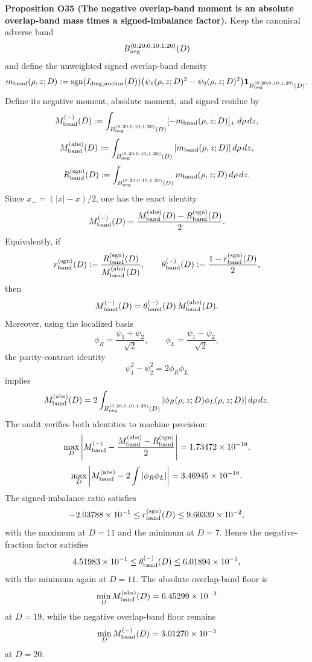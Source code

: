 \documentclass[aps,prd,onecolumn,notitlepage,nofootinbib,superscriptaddress,11pt,floatfix]{revtex4-2}
\begin{document}
\medskip\noindent\textbf{Proposition O35 (The negative overlap-band moment is an absolute overlap-band mass times a signed-imbalance factor).}
Keep the canonical adverse band
\[
B_{\rm neg}^{(0.20;0.10,1.20)}(D)
\]
and define the unweighted signed overlap-band density
\[
m_{\rm band}(\rho,z;D)
:=
\operatorname{sgn}(I_{\rm diag,anchor}(D))\bigl(\psi_1(\rho,z;D)^2-\psi_2(\rho,z;D)^2\bigr)
\mathbf 1_{B_{\rm neg}^{(0.20;0.10,1.20)}(D)}.
\]
Define its negative moment, absolute moment, and signed residue by
\[
M_{\rm band}^{(-)}(D)
:=
\int_{B_{\rm neg}^{(0.20;0.10,1.20)}(D)} [ -m_{\rm band}(\rho,z;D)]_+\,d\rho\,dz,
\]
\[
M_{\rm band}^{\rm(abs)}(D)
:=
\int_{B_{\rm neg}^{(0.20;0.10,1.20)}(D)} |m_{\rm band}(\rho,z;D)|\,d\rho\,dz,
\]
\[
R_{\rm band}^{\rm(sgn)}(D)
:=
\int_{B_{\rm neg}^{(0.20;0.10,1.20)}(D)} m_{\rm band}(\rho,z;D)\,d\rho\,dz.
\]
Since \(x_-=(|x|-x)/2\), one has the exact identity
\[
M_{\rm band}^{(-)}(D)
=
\frac{M_{\rm band}^{\rm(abs)}(D)-R_{\rm band}^{\rm(sgn)}(D)}{2}.
\]
Equivalently, if
\[
r_{\rm band}^{\rm(sgn)}(D)
:=
\frac{R_{\rm band}^{\rm(sgn)}(D)}{M_{\rm band}^{\rm(abs)}(D)},
\qquad
\theta_{\rm band}^{(-)}(D)
:=
\frac{1-r_{\rm band}^{\rm(sgn)}(D)}{2},
\]
then
\[
M_{\rm band}^{(-)}(D)=\theta_{\rm band}^{(-)}(D)\,M_{\rm band}^{\rm(abs)}(D).
\]
Moreover, using the localized basis
\[
\phi_R=\frac{\psi_1+\psi_2}{\sqrt2},
\qquad
\phi_L=\frac{\psi_1-\psi_2}{\sqrt2},
\]
the parity-contrast identity
\[
\psi_1^2-\psi_2^2=2\phi_R\phi_L
\]
implies
\[
M_{\rm band}^{\rm(abs)}(D)
=
2\int_{B_{\rm neg}^{(0.20;0.10,1.20)}(D)} |\phi_R(\rho,z;D)\phi_L(\rho,z;D)|\,d\rho\,dz.
\]
The audit
verifies both identities to machine precision:
\[
\max_D \left|M_{\rm band}^{(-)}-\frac{M_{\rm band}^{\rm(abs)}-R_{\rm band}^{\rm(sgn)}}{2}\right|
=
1.73472\times10^{-18},
\]
\[
\max_D \left|M_{\rm band}^{\rm(abs)}-2\int |\phi_R\phi_L|\right|
=
3.46945\times10^{-18}.
\]
The signed-imbalance ratio satisfies
\[
-2.03788\times10^{-1}
\le
r_{\rm band}^{\rm(sgn)}(D)
\le
9.60339\times10^{-2},
\]
with the maximum at \(D=11\) and the minimum at \(D=7\). Hence the negative-fraction factor satisfies
\[
4.51983\times10^{-1}
\le
\theta_{\rm band}^{(-)}(D)
\le
6.01894\times10^{-1},
\]
with the minimum again at \(D=11\). The absolute overlap-band floor is
\[
\min_D M_{\rm band}^{\rm(abs)}(D)
=
6.45299\times10^{-3}
\]
at \(D=19\), while the negative overlap-band floor remains
\[
\min_D M_{\rm band}^{(-)}(D)
=
3.01270\times10^{-3}
\]
at \(D=20\).
\end{document}
